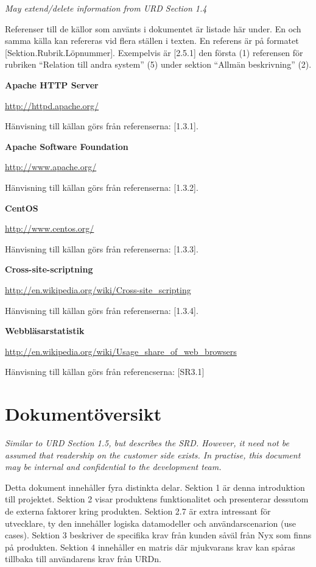 \documentclass[a4paper, twoside, 11pt, titlepage]{article}
\begin{document}
\emph{May extend/delete information from URD Section 1.4}

Referenser till de källor som använts i dokumentet är listade här under. En och samma källa kan refereras vid flera ställen i texten. En referens är på formatet [Sektion.Rubrik.Löpnummer]. Exempelvis är [2.5.1] den första (1) referensen för rubriken ``Relation till andra system'' (5) under sektion ``Allmän beskrivning'' (2).

\textbf{Apache HTTP Server}

\url{http://httpd.apache.org/}

Hänvisning till källan görs från referenserna: [1.3.1].

\textbf{Apache Software Foundation}

\url{http://www.apache.org/}

Hänvisning till källan görs från referenserna: [1.3.2].

\textbf{CentOS}

\url{http://www.centos.org/}

Hänvisning till källan görs från referenserna: [1.3.3].

\textbf{Cross-site-scriptning}

\url{http://en.wikipedia.org/wiki/Cross-site_scripting}

Hänvisning till källan görs från referenserna: [1.3.4].

\textbf{Webbläsarstatistik}

\url{http://en.wikipedia.org/wiki/Usage_share_of_web_browsers}

Hänvisning till källan görs från referencserna: [SR3.1]

\clearpage
\section{Dokumentöversikt}


\emph{Similar to URD Section 1.5, but describes the SRD. However, it need not be assumed that readership on the customer side exists. In practise, this document may be internal and confidential to the development team.}

Detta dokument innehåller fyra distinkta delar. Sektion 1 är denna introduktion till projektet. Sektion 2 visar produktens funktionalitet och presenterar dessutom de externa faktorer kring produkten. Sektion 2.7 är extra intressant för utvecklare, ty den innehåller logiska datamodeller och användarscenarion (use cases).  Sektion 3 beskriver de specifika krav från kunden såväl från Nyx som finns på produkten. Sektion 4 innehåller en matris där mjukvarans krav kan spåras tillbaka till användarens krav från URDn.
\end{document}
